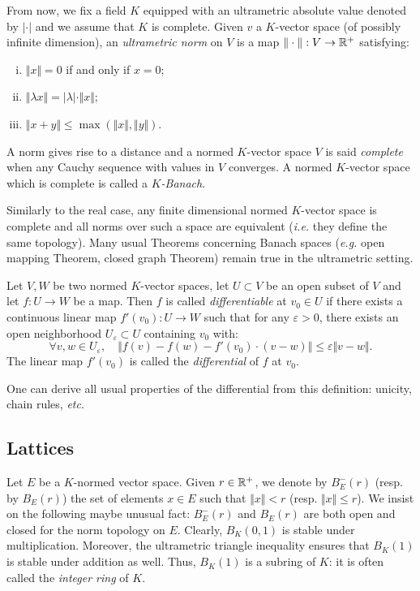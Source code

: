 \documentclass{lms}
\begin{document}
From now, we fix a field $K$ equipped with an ultrametric absolute value 
denoted by $|\cdot|$ and we assume that $K$ is complete. Given $v$ a 
$K$-vector space (of possibly infinite dimension), an \emph{ultrametric 
norm} on $V$ is a map $\Vert\cdot\Vert : V \to \mathbb R^+$ satisfying:
\begin{enumerate}[(i)]
\item $\Vert x\Vert = 0$ if and only if $x = 0$;
\item $\Vert \lambda x\Vert = |\lambda| \cdot \Vert x\Vert$;
\item $\Vert x+y\Vert \leq \max(\Vert x\Vert, \Vert y\Vert)$.
\end{enumerate}
A norm gives rise to a distance and a normed $K$-vector space $V$ is 
said \emph{complete} when any Cauchy sequence with values in $V$ 
converges. A normed $K$-vector space which is complete is called a 
\emph{$K$-Banach}.

Similarly to the real case, any finite dimensional normed $K$-vector 
space is complete and all norms over such a space are equivalent 
(\emph{i.e.} they define the same topology). Many usual Theorems 
concerning Banach spaces (\emph{e.g.} open mapping Theorem, closed graph 
Theorem) remain true in the ultrametric setting.

\begin{deftn} \label{deftn : diff}
Let $V, W$ be two normed $K$-vector spaces, let $U \subset V$ be an open 
subset of $V$ and let $f : U \rightarrow W$ be a map. Then $f$ is called 
\emph{differentiable} at $v_0 \in U$ if there exists a 
continuous linear map $f'(v_0) : U \rightarrow W$ such that for any 
$\varepsilon >0$, there exists an open neighborhood $U_\varepsilon 
\subset U$ containing $v_0$ with:
\[ 
\forall v, w \in U_\varepsilon, \quad
\Vert f(v)-f(w)-f'(v_0) \cdot \left( v-w \right) \Vert 
\leq \varepsilon \Vert v-w \Vert. 
\]
The linear map $f'(v_0)$ is called the \emph{differential} of $f$ at $v_0$.
\end{deftn}

One can derive all usual properties of the differential from this 
definition: unicity, chain rules, \emph{etc}.

\subsection{Lattices}

Let $E$ be a $K$-normed vector space. Given $r \in \mathbb R^+$, 
we denote by $B^-_E(r)$ (resp. by $B_E(r)$) the set of elements $x 
\in E$ such that $\Vert x \Vert < r$ (resp. $\Vert x \Vert \leq r$). 
We insist on the following maybe unusual fact: $B^-_E(r)$ and 
$B_E(r)$ are both open and closed for the norm topology on $E$.
Clearly, $B_K(0,1)$ is stable under multiplication. Moreover, the 
ultrametric triangle inequality ensures that $B_K(1)$ is stable under 
addition as well. Thus, $B_K(1)$ is a subring of $K$: it is often 
called the \emph{integer ring} of $K$.
\end{document}
